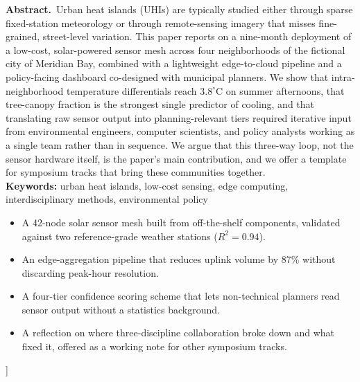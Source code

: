 \documentclass[10pt,twocolumn]{article}
\begin{document}
{\begin{@twocolumnfalse}
\vspace{0.5cm}

\begin{tcolorbox}[colback=mist, colframe=deepteal, boxrule=0.7pt, arc=2pt,
  left=8pt, right=8pt, top=6pt, bottom=6pt]
\textbf{\color{deepteal}Abstract.}\ Urban heat islands (UHIs) are typically studied either through
sparse fixed-station meteorology or through remote-sensing imagery that misses fine-grained,
street-level variation. This paper reports on a nine-month deployment of a low-cost, solar-powered
sensor mesh across four neighborhoods of the fictional city of Meridian Bay, combined with a
lightweight edge-to-cloud pipeline and a policy-facing dashboard co-designed with municipal
planners. We show that intra-neighborhood temperature differentials reach $3.8^\circ$C on
summer afternoons, that tree-canopy fraction is the strongest single predictor of cooling, and
that translating raw sensor output into planning-relevant tiers required iterative input from
environmental engineers, computer scientists, and policy analysts working as a single team
rather than in sequence. We argue that this three-way loop, not the sensor hardware itself, is
the paper's main contribution, and we offer a template for symposium tracks that bring these
communities together.
\vspace{2pt}\\
\textbf{Keywords:} urban heat islands, low-cost sensing, edge computing, interdisciplinary
methods, environmental policy
\end{tcolorbox}

\vspace{0.35cm}

\begin{contribbox}
\begin{itemize}[leftmargin=1.1em, itemsep=1pt, topsep=2pt]
  \item A 42-node solar sensor mesh built from off-the-shelf components, validated against two
    reference-grade weather stations ($R^2 = 0.94$).
  \item An edge-aggregation pipeline that reduces uplink volume by 87\% without discarding
    peak-hour resolution.
  \item A four-tier confidence scoring scheme that lets non-technical planners read sensor
    output without a statistics background.
  \item A reflection on where three-discipline collaboration broke down and what fixed it,
    offered as a working note for other symposium tracks.
\end{itemize}
\end{contribbox}

\vspace{0.4cm}
\end{@twocolumnfalse}
}]
\makeatother
\thispagestyle{empty}
\end{document}
